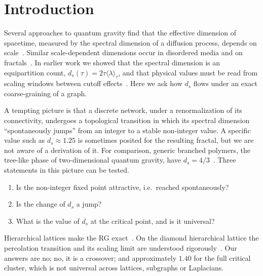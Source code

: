 \documentclass[11pt]{article}
\theoremstyle{remark}\newtheorem*{remark}{Remark}
\begin{document}
\tableofcontents

\section{Introduction}
\label{sec:intro}

Several approaches to quantum gravity find that the effective dimension of spacetime, measured by the spectral
dimension of a diffusion process, depends on scale~\cite{AJL,Carlip}. Similar scale-dependent dimensions occur in
disordered media and on fractals~\cite{BenAvrahamHavlin}. In earlier work we showed that the
spectral dimension is an equipartition count, $d_s(\tau)=2\tau\langle\lambda\rangle_\tau$, and that physical values must be
read from scaling windows between cutoff effects~\cite{Chen2026_qgc}. Here we ask how $d_s$ flows under an exact
coarse-graining of a graph.

A tempting picture is that a discrete network, under a renormalization of its connectivity, undergoes a topological
transition in which its spectral dimension ``spontaneously jumps'' from an integer to a stable non-integer value.
A specific value such as $d_s\approx1.25$ is sometimes posited for the resulting fractal, but we are not aware of a
derivation of it. For comparison, generic branched polymers, the tree-like phase of two-dimensional quantum gravity,
have $d_s=4/3$~\cite{JonssonWheater}. Three statements in this picture can be tested.
\begin{enumerate}
\item Is the non-integer fixed point attractive, i.e.\ reached spontaneously?
\item Is the change of $d_s$ a jump?
\item What is the value of $d_s$ at the critical point, and is it universal?
\end{enumerate}
Hierarchical lattices make the RG exact~\cite{BerkerOstlund,KaufmanGriffiths}. On the diamond hierarchical lattice the
percolation transition and its scaling limit are understood rigorously~\cite{HamblyKumagai}. Our answers are no; no,
it is a crossover; and approximately $1.40$ for the full critical cluster, which is not universal across lattices,
subgraphs or Laplacians.
\end{document}
